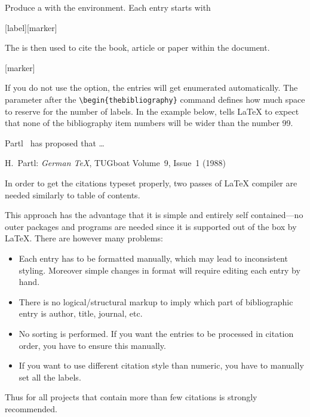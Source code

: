 Produce a  with the 
environment.  Each entry starts with
\begin{lscommand}
[label][marker]
\end{lscommand}
The  is then used to cite the book, article or paper
within the document.
\begin{lscommand}
[marker]
\end{lscommand}
If you do not use the  option, the entries will get enumerated
automatically.  The parameter after the \verb|\begin{thebibliography}|
command defines how much space to reserve for the number of labels. In the example below,
 tells \LaTeX{} to expect that none of the bibliography item numbers will be wider
than the number 99.
\begin{example}[standalone, paperwidth=7cm, paperheight=4cm]
Partl~\cite{pa} has
proposed that \ldots
\begin{thebibliography}{99}
 H.~Partl:
\emph{German \TeX},
TUGboat Volume~9, Issue~1 (1988)
\end{thebibliography}
\end{example}

In order to get the citations typeset properly, two passes of \LaTeX{} compiler
are needed similarly to table of contents.

This approach has the advantage that it is simple and entirely self
contained---no outer packages and programs are needed since it is supported out
of the box by \LaTeX{}. There are however many problems:
\begin{itemize}
  \item Each entry has to be formatted manually, which may lead to inconsistent
  styling. Moreover simple changes in format will require editing each entry by
  hand.
  \item There is no logical/structural markup to imply which part of
  bibliographic entry is author, title, journal, etc.
  \item No sorting is performed. If you want the entries to be processed in
  citation order, you have to ensure this manually.
  \item If you want to use different citation style than numeric, you have to
  manually set all the labels.
\end{itemize}
Thus for all projects that contain more than few citations  is
strongly recommended.


